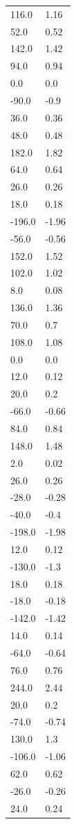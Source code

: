 \begin{longtable}{ll}
116.0 & 1.16 \\
52.0 & 0.52 \\
142.0 & 1.42 \\
94.0 & 0.94 \\
0.0 & 0.0 \\
-90.0 & -0.9 \\
36.0 & 0.36 \\
48.0 & 0.48 \\
182.0 & 1.82 \\
64.0 & 0.64 \\
26.0 & 0.26 \\
18.0 & 0.18 \\
-196.0 & -1.96 \\
-56.0 & -0.56 \\
152.0 & 1.52 \\
102.0 & 1.02 \\
8.0 & 0.08 \\
136.0 & 1.36 \\
70.0 & 0.7 \\
108.0 & 1.08 \\
0.0 & 0.0 \\
12.0 & 0.12 \\
20.0 & 0.2 \\
-66.0 & -0.66 \\
84.0 & 0.84 \\
148.0 & 1.48 \\
2.0 & 0.02 \\
26.0 & 0.26 \\
-28.0 & -0.28 \\
-40.0 & -0.4 \\
-198.0 & -1.98 \\
12.0 & 0.12 \\
-130.0 & -1.3 \\
18.0 & 0.18 \\
-18.0 & -0.18 \\
-142.0 & -1.42 \\
14.0 & 0.14 \\
-64.0 & -0.64 \\
76.0 & 0.76 \\
244.0 & 2.44 \\
20.0 & 0.2 \\
-74.0 & -0.74 \\
130.0 & 1.3 \\
-106.0 & -1.06 \\
62.0 & 0.62 \\
-26.0 & -0.26 \\
24.0 & 0.24 \\

\end{longtable}
